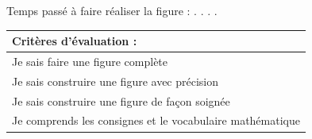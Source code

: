 \documentclass[a4paper,11pt]{article}
\begin{document}
\vspace*{1cm}


Temps passé à faire réaliser la figure : . . . .\\

\vspace*{1cm}

\begin{flushright}
\begin{tabular}{|p{9cm}|}
\hline 
\textbf{Critères d'évaluation :} \\ 
\hline 
Je sais faire une figure complète\\
Je sais construire une figure avec précision\\
Je sais construire une figure de façon soignée\\
Je comprends les consignes et le vocabulaire mathématique \\
\hline 
\end{tabular} 

\end{flushright}
\end{document}
